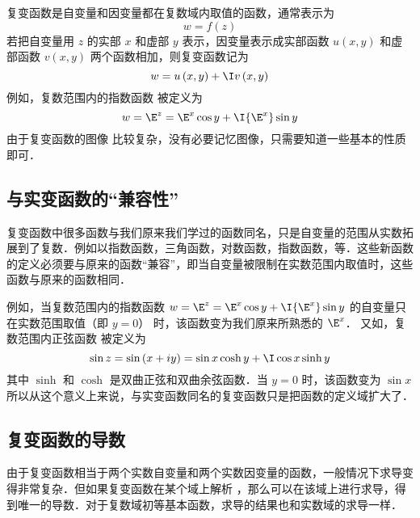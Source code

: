 复变函数是自变量和因变量都在复数域内取值的函数，通常表示为
\begin{equation}
w = f\left( z \right)
\end{equation}
若把自变量用 $z$ 的实部 $x$ 和虚部 $y$ 表示，因变量表示成实部函数 $u\left( {x,y} \right)$ 和虚部函数 $v\left( {x,y} \right)$ 两个函数相加，则复变函数记为
\begin{equation}
w = u\left( {x,y} \right) + \I v\left( {x,y} \right)
\end{equation}
例如，复数范围内的指数函数%
被定义为
\begin{equation}
w = {\E^z} = {\E^x}\cos y + \I {\E^x}\sin y
\end{equation}
由于复变函数的图像%
比较复杂，没有必要记忆图像，只需要知道一些基本的性质即可．

\subsection{与实变函数的“兼容性”}
复变函数中很多函数与我们原来我们学过的函数同名，只是自变量的范围从实数拓展到了复数．例如以指数函数，三角函数，对数函数，指数函数，等．这些新函数的定义必须要与原来的函数“兼容”，即当自变量被限制在实数范围内取值时，这些函数与原来的函数相同．

例如，当复数范围内的指数函数%
 $w = {\E^z} = {\E^x}\cos y + \I {\E^x}\sin y$ 的自变量只在实数范围取值（即 $y = 0$） 时，该函数变为我们原来所熟悉的 $\E^x$． 
又如，复数范围内正弦函数%
被定义为
\begin{equation}
\sin z = \sin \left( {x + iy} \right) = \sin x\cosh y + \I\cos x\sinh y
\end{equation}
其中 $\sinh $ 和 $\cosh $ 是双曲正弦和双曲余弦函数．当 $y = 0$ 时，该函数变为 $\sin x$ 
所以从这个意义上来说，与实变函数同名的复变函数只是把函数的定义域扩大了．

\subsection{复变函数的导数}
由于复变函数相当于两个实数自变量和两个实数因变量的函数，一般情况下求导变得非常复杂．但如果复变函数在某个域上解析%
，那么可以在该域上进行求导，得到唯一的导数．对于复数域初等基本函数，求导的结果也和实数域的求导一样．















